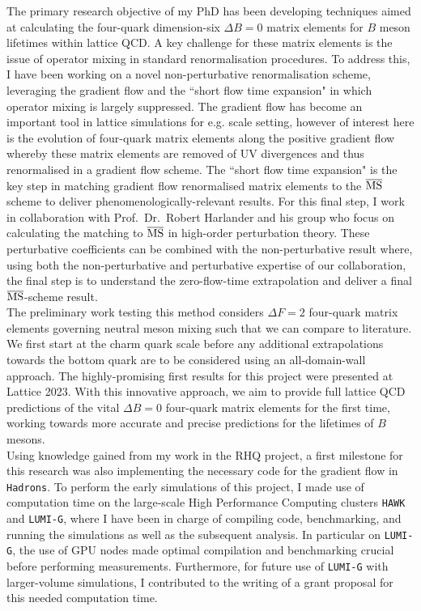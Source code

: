 \documentclass[11pt, a4paper]{awesome-cv}
\begin{document}
\begin{cvletter}
The primary research objective of my PhD has been developing techniques aimed at calculating the four-quark dimension-six $\Delta B=0$ matrix elements for $B$ meson lifetimes within lattice QCD. 
A key challenge for these matrix elements is the issue of operator mixing in standard renormalisation procedures. 
To address this, I have been working on a novel non-perturbative renormalisation scheme, leveraging the gradient flow and the ``short flow time expansion" in which operator mixing is largely suppressed. 
The gradient flow has become an important tool in lattice simulations for e.g. scale setting, however of interest here is the evolution of four-quark matrix elements along the positive gradient flow whereby these matrix elements are removed of UV divergences and thus renormalised in a gradient flow scheme.
The ``short flow time expansion" is the key step in matching gradient flow renormalised matrix elements to the $\overline{\rm MS}$ scheme to deliver phenomenologically-relevant results. 
For this final step, I work in collaboration with Prof.~Dr.~Robert Harlander and his group who focus on calculating the matching to $\overline{\rm MS}$ in high-order perturbation theory.
These perturbative coefficients can be combined with the non-perturbative result where, using both the non-perturbative and perturbative expertise of our collaboration, the final step is to understand the zero-flow-time extrapolation and deliver a final $\overline{\rm MS}$-scheme result.\\
The preliminary work testing this method considers $\Delta F=2$ four-quark matrix elements governing neutral meson mixing such that we can compare to literature.
We first start at the charm quark scale before any additional extrapolations towards the bottom quark are to be considered using an all-domain-wall approach.
The highly-promising first results for this project were presented at Lattice 2023.
With this innovative approach, we aim to provide full lattice QCD predictions of the vital $\Delta B=0$ four-quark matrix elements for the first time, working towards more accurate and precise predictions for the lifetimes of $B$ mesons.\\
Using knowledge gained from my work in the RHQ project, a first milestone for this research was also implementing the necessary code for the gradient flow in {\tt Hadrons}.
To perform the early simulations of this project, I made use of computation time on the large-scale High Performance Computing clusters {\tt HAWK} and {\tt LUMI-G}, where I have been in charge of compiling code, benchmarking, and running the simulations as well as the subsequent analysis. 
In particular on {\tt LUMI-G}, the use of GPU nodes made optimal compilation and benchmarking crucial before performing measurements.
Furthermore, for future use of {\tt LUMI-G} with larger-volume simulations, I contributed to the writing of a grant proposal for this needed computation time.


\end{cvletter}
\end{document}

